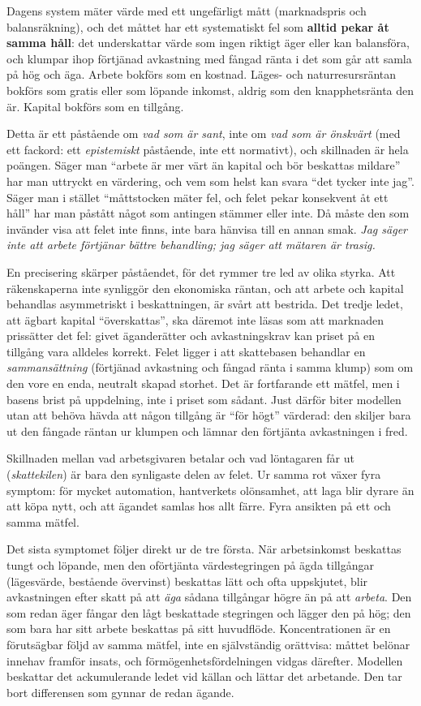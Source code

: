 \documentclass[11pt]{article}
\begin{document}
Dagens system mäter värde med ett ungefärligt mått (marknadspris och balansräkning), och det måttet har ett systematiskt fel som \textbf{alltid pekar åt samma håll}: det underskattar värde som ingen riktigt äger eller kan balansföra, och klumpar ihop förtjänad avkastning med fångad ränta i det som går att samla på hög och äga. Arbete bokförs som en kostnad. Läges- och naturresursräntan bokförs som gratis eller som löpande inkomst, aldrig som den knapphetsränta den är. Kapital bokförs som en tillgång.

Detta är ett påstående om \emph{vad som är sant}, inte om \emph{vad som är önskvärt} (med ett fackord: ett \emph{epistemiskt} påstående, inte ett normativt), och skillnaden är hela poängen. Säger man \enquote{arbete är mer värt än kapital och bör beskattas mildare} har man uttryckt en värdering, och vem som helst kan svara \enquote{det tycker inte jag}. Säger man i stället \enquote{måttstocken mäter fel, och felet pekar konsekvent åt ett håll} har man påstått något som antingen stämmer eller inte. Då måste den som invänder visa att felet inte finns, inte bara hänvisa till en annan smak. \emph{Jag säger inte att arbete förtjänar bättre behandling; jag säger att mätaren är trasig.}

En precisering skärper påståendet, för det rymmer tre led av olika styrka. Att räkenskaperna inte synliggör den ekonomiska räntan, och att arbete och kapital behandlas asymmetriskt i beskattningen, är svårt att bestrida. Det tredje ledet, att ägbart kapital \enquote{överskattas}, ska däremot inte läsas som att marknaden prissätter det fel: givet äganderätter och avkastningskrav kan priset på en tillgång vara alldeles korrekt. Felet ligger i att skattebasen behandlar en \emph{sammansättning} (förtjänad avkastning och fångad ränta i samma klump) som om den vore en enda, neutralt skapad storhet. Det är fortfarande ett mätfel, men i basens brist på uppdelning, inte i priset som sådant. Just därför biter modellen utan att behöva hävda att någon tillgång är \enquote{för högt} värderad: den skiljer bara ut den fångade räntan ur klumpen och lämnar den förtjänta avkastningen i fred.

Skillnaden mellan vad arbetsgivaren betalar och vad löntagaren får ut (\emph{skattekilen}) är bara den synligaste delen av felet. Ur samma rot växer fyra symptom: för mycket automation, hantverkets olönsamhet, att laga blir dyrare än att köpa nytt, och att ägandet samlas hos allt färre. Fyra ansikten på ett och samma mätfel.

Det sista symptomet följer direkt ur de tre första. När arbetsinkomst beskattas tungt och löpande, men den oförtjänta värdestegringen på ägda tillgångar (lägesvärde, bestående övervinst) beskattas lätt och ofta uppskjutet, blir avkastningen efter skatt på att \emph{äga} sådana tillgångar högre än på att \emph{arbeta}. Den som redan äger fångar den lågt beskattade stegringen och lägger den på hög; den som bara har sitt arbete beskattas på sitt huvudflöde. Koncentrationen är en förutsägbar följd av samma mätfel, inte en självständig orättvisa: måttet belönar innehav framför insats, och förmögenhetsfördelningen vidgas därefter. Modellen beskattar det ackumulerande ledet vid källan och lättar det arbetande. Den tar bort differensen som gynnar de redan ägande.
\end{document}
